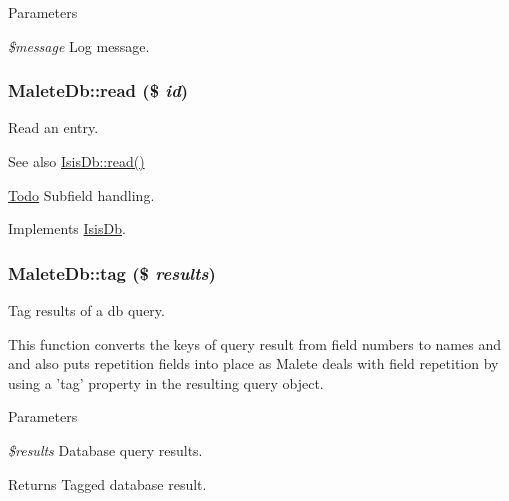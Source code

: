 \begin{DoxyParams}{Parameters}
\item[{\em \$message}]Log message. \end{DoxyParams}
\hypertarget{classMaleteDb_ad2a65876db24adc388afce465e0c153e}{
\subsubsection[{read}]{\setlength{\rightskip}{0pt plus 5cm}MaleteDb::read (\$ {\em id})}}
\label{classMaleteDb_ad2a65876db24adc388afce465e0c153e}
Read an entry.

\begin{DoxySeeAlso}{See also}
\hyperlink{interfaceIsisDb_a68335ec0db01ef03f0725621b38b5686}{IsisDb::read()}
\end{DoxySeeAlso}
\begin{Desc}
\item[\hyperlink{todo__todo000002}{Todo}]Subfield handling. \end{Desc}


Implements \hyperlink{interfaceIsisDb_a68335ec0db01ef03f0725621b38b5686}{IsisDb}.

\hypertarget{classMaleteDb_ac87c3ac1b3d9a6297be8574aa303e033}{
\subsubsection[{tag}]{\setlength{\rightskip}{0pt plus 5cm}MaleteDb::tag (\$ {\em results})}}
\label{classMaleteDb_ac87c3ac1b3d9a6297be8574aa303e033}
Tag results of a db query.

This function converts the keys of query result from field numbers to names and and also puts repetition fields into place as Malete deals with field repetition by using a 'tag' property in the resulting query object.


\begin{DoxyParams}{Parameters}
\item[{\em \$results}]Database query results.\end{DoxyParams}
\begin{DoxyReturn}{Returns}
Tagged database result. 
\end{DoxyReturn}


